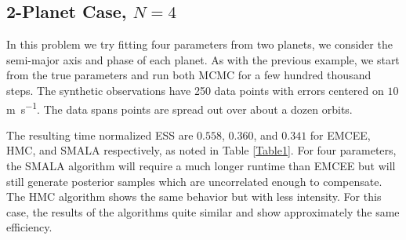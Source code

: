 \documentclass{aa}
\begin{document}
\begin{table}
\caption{MCMC Efficiency Results}             %
\label{Table1}      %
\centering                         
{}
\end{table}

\subsection{2-Planet Case, $N=4$}\label{n4section}

In this problem we try fitting four parameters from two planets, we consider the semi-major axis and phase of each planet. As with the previous example, we start from the true parameters and run both MCMC for a few hundred thousand steps. The synthetic observations have 250 data points with errors centered on $10$ \si{\metre\per\second}. The data spans points are spread out over about a dozen orbits.

The resulting time normalized ESS are $0.558$, $0.360$, and $0.341$ for EMCEE, HMC, and SMALA respectively, as noted in Table \ref{Table1}. For four parameters, the SMALA algorithm will require a much longer runtime than EMCEE but will still generate posterior samples which are uncorrelated enough to compensate. The HMC algorithm shows the same behavior but with less intensity. For this case, the results of the algorithms quite similar and show approximately the same efficiency.
\end{document}
